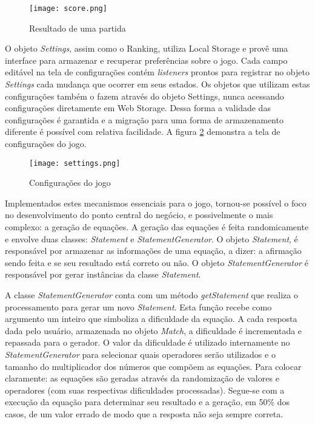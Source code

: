 \begin{figure}[H]
    \centering
    \texttt{[image: score.png]}
	\caption{Resultado de uma partida}
    \label{fig:placar}
\end{figure}

O objeto \textit{Settings}, assim como o Ranking, utiliza Local Storage
e provê uma interface para armazenar e recuperar preferências sobre
o jogo. Cada campo editável na tela de configurações contém
\textit{listeners} prontos para registrar no objeto \textit{Settings}
cada mudança que ocorrer em seus estados. Os objetos que utilizam estas
configurações também o fazem através do objeto Settings, nunca
acessando configurações diretamente em Web Storage. Dessa forma a
validade das configurações é garantida e a migração para uma forma
de armazenamento diferente é possível com relativa facilidade.
A figura \ref{fig:configurations} demonstra a tela de configurações do 
jogo.

\begin{figure}[H]
    \centering
    \texttt{[image: settings.png]}
	\caption{Configurações do jogo}
    \label{fig:configurations}
\end{figure}

Implementados estes mecanismos essenciais para o jogo, tornou-se possível o foco no
desenvolvimento do ponto central do negócio, e possivelmente o mais complexo: a geração
de equações. A geração das equações é feita randomicamente e
envolve duas classes: \textit{Statement} e \textit{StatementGenerator}.
O objeto \textit{Statement}, é responsável por armazenar as
informações de uma equação, a dizer: a afirmação sendo feita
e se seu resultado está correto ou não.
O objeto \textit{StatementGenerator} é responsável por gerar
instâncias da classe \textit{Statement}.

A classe \textit{StatementGenerator} conta com um método
\textit{getStatement} que realiza o processamento para gerar um novo
\textit{Statement}. Esta função recebe como argumento um inteiro que
simboliza a dificuldade da equação. A cada resposta dada pelo usuário,
armazenada no objeto \textit{Match}, a dificuldade é incrementada
e repassada para o gerador. O valor da dificuldade é utilizado
internamente no \textit{StatementGenerator} para selecionar quais
operadores serão utilizados e o tamanho do multiplicador dos números
que compõem as equações. Para colocar claramente: as equações
são geradas através da randomização de valores e operadores (com
suas respectivas dificuldades processadas). Segue-se com a execução da
equação para determinar seu resultado e a geração, em 50\% dos
casos, de um valor errado de modo que a resposta não seja sempre
correta.

